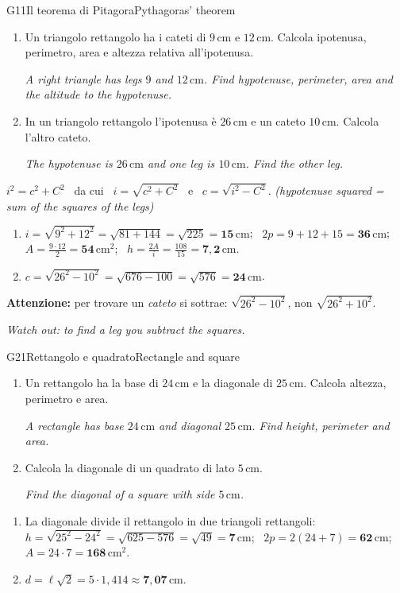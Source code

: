 \documentclass[11pt,a4paper]{article}
\newcommand{\en}[1]{\par{\small\itshape\color{engray}#1\par}}
\newcommand{\enx}[1]{{\small\itshape\color{engray}(#1)}}
\newcommand{\unit}[1]{\,\mathrm{#1}}
\newcommand{\cm}{\unit{cm}}
\newcommand{\cmq}{\unit{cm^2}}
\newcommand{\errore}[2]{\begin{attenzione}\textbf{\color{fgA}Attenzione:} #1\par
  {\itshape\color{engray}Watch out: #2}\end{attenzione}}
\begin{document}
\begin{esercizio}{G1}{1}{Il teorema di Pitagora}{Pythagoras' theorem}
\begin{enumerate}
\item Un triangolo rettangolo ha i cateti di $9\cm$ e $12\cm$. Calcola ipotenusa, perimetro, area e altezza relativa all'ipotenusa.
\en{A right triangle has legs $9$ and $12\cm$. Find hypotenuse, perimeter, area and the altitude to the hypotenuse.}
\item In un triangolo rettangolo l'ipotenusa è $26\cm$ e un cateto $10\cm$. Calcola l'altro cateto.
\en{The hypotenuse is $26\cm$ and one leg is $10\cm$. Find the other leg.}
\end{enumerate}
\end{esercizio}
\begin{solbox}
$i^2=c^2+C^2$ \ da cui \ $i=\sqrt{c^2+C^2}$ \ e \ $c=\sqrt{i^2-C^2}$. \enx{hypotenuse squared = sum of the squares of the legs}
\begin{enumerate}
\item $i=\sqrt{9^2+12^2}=\sqrt{81+144}=\sqrt{225}=\mathbf{15\cm}$; \ $2p=9+12+15=\mathbf{36\cm}$; \ $A=\frac{9\cdot12}{2}=\mathbf{54\cmq}$; \ $h=\frac{2A}{i}=\frac{108}{15}=\mathbf{7,2\cm}$.
\item $c=\sqrt{26^2-10^2}=\sqrt{676-100}=\sqrt{576}=\mathbf{24\cm}$.
\end{enumerate}
\errore{per trovare un \emph{cateto} si sottrae: $\sqrt{26^2-10^2}$, non $\sqrt{26^2+10^2}$.}{to find a leg you subtract the squares.}
\end{solbox}

\begin{esercizio}{G2}{1}{Rettangolo e quadrato}{Rectangle and square}
\begin{enumerate}
\item Un rettangolo ha la base di $24\cm$ e la diagonale di $25\cm$. Calcola altezza, perimetro e area.
\en{A rectangle has base $24\cm$ and diagonal $25\cm$. Find height, perimeter and area.}
\item Calcola la diagonale di un quadrato di lato $5\cm$.
\en{Find the diagonal of a square with side $5\cm$.}
\end{enumerate}
\end{esercizio}
\begin{solbox}
\begin{enumerate}
\item La diagonale divide il rettangolo in due triangoli rettangoli: $h=\sqrt{25^2-24^2}=\sqrt{625-576}=\sqrt{49}=\mathbf{7\cm}$; \ $2p=2(24+7)=\mathbf{62\cm}$; \ $A=24\cdot7=\mathbf{168\cmq}$.
\item $d=\ell\sqrt2=5\cdot1,414\approx\mathbf{7,07\cm}$.
\end{enumerate}
\end{solbox}
\end{document}
